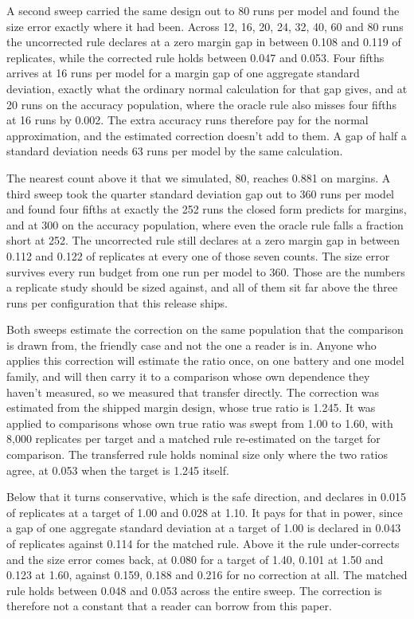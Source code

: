 A second sweep carried the same design out to 80 runs per model and found the size error exactly where it had been. Across 12, 16, 20, 24, 32, 40, 60 and 80 runs the uncorrected rule declares at a zero margin gap in between 0.108 and 0.119 of replicates, while the corrected rule holds between 0.047 and 0.053. Four fifths arrives at 16 runs per model for a margin gap of one aggregate standard deviation, exactly what the ordinary normal calculation for that gap gives, and at 20 runs on the accuracy population, where the oracle rule also misses four fifths at 16 runs by 0.002. The extra accuracy runs therefore pay for the normal approximation, and the estimated correction doesn't add to them. A gap of half a standard deviation needs 63 runs per model by the same calculation.

The nearest count above it that we simulated, 80, reaches 0.881 on margins. A third sweep took the quarter standard deviation gap out to 360 runs per model and found four fifths at exactly the 252 runs the closed form predicts for margins, and at 300 on the accuracy population, where even the oracle rule falls a fraction short at 252. The uncorrected rule still declares at a zero margin gap in between 0.112 and 0.122 of replicates at every one of those seven counts. The size error survives every run budget from one run per model to 360. Those are the numbers a replicate study should be sized against, and all of them sit far above the three runs per configuration that this release ships.

Both sweeps estimate the correction on the same population that the comparison is drawn from, the friendly case and not the one a reader is in. Anyone who applies this correction will estimate the ratio once, on one battery and one model family, and will then carry it to a comparison whose own dependence they haven't measured, so we measured that transfer directly. The correction was estimated from the shipped margin design, whose true ratio is 1.245. It was applied to comparisons whose own true ratio was swept from 1.00 to 1.60, with 8,000 replicates per target and a matched rule re-estimated on the target for comparison. The transferred rule holds nominal size only where the two ratios agree, at 0.053 when the target is 1.245 itself.

Below that it turns conservative, which is the safe direction, and declares in 0.015 of replicates at a target of 1.00 and 0.028 at 1.10. It pays for that in power, since a gap of one aggregate standard deviation at a target of 1.00 is declared in 0.043 of replicates against 0.114 for the matched rule. Above it the rule under-corrects and the size error comes back, at 0.080 for a target of 1.40, 0.101 at 1.50 and 0.123 at 1.60, against 0.159, 0.188 and 0.216 for no correction at all. The matched rule holds between 0.048 and 0.053 across the entire sweep. The correction is therefore not a constant that a reader can borrow from this paper.

